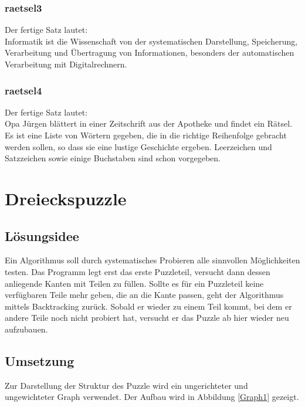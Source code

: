 \documentclass[a4paper, 12pt]{scrartcl}
\begin{document}
\subsubsection{raetsel3}
Der fertige Satz lautet:\\
Informatik ist die Wissenschaft von der systematischen Darstellung, Speicherung, Verarbeitung und Übertragung von Informationen, besonders der automatischen Verarbeitung mit Digitalrechnern.

\subsubsection{raetsel4}
Der fertige Satz lautet:\\
Opa Jürgen blättert in einer Zeitschrift aus der Apotheke und findet ein Rätsel. Es ist eine Liste von Wörtern gegeben, die in die richtige Reihenfolge gebracht werden sollen, so dass sie eine lustige Geschichte ergeben. Leerzeichen und Satzzeichen sowie einige Buchstaben sind schon vorgegeben.

\section{Dreieckspuzzle}
\subsection{Lösungsidee}

Ein Algorithmus soll durch systematisches Probieren alle sinnvollen Möglichkeiten testen. Das Programm legt erst das erste Puzzleteil, versucht dann dessen anliegende Kanten mit Teilen zu füllen. Sollte es für ein Puzzleteil keine verfügbaren Teile mehr geben, die an die Kante passen, geht der Algorithmus mittels Backtracking zurück. Sobald er wieder zu einem Teil kommt, bei dem er andere Teile noch nicht probiert hat, versucht er das Puzzle ab hier wieder neu aufzubauen.

\subsection{Umsetzung}

Zur Darstellung der Struktur des Puzzle wird ein ungerichteter und ungewichteter Graph verwendet. Der Aufbau wird in Abbildung \ref{Graph1} gezeigt.
\end{document}
